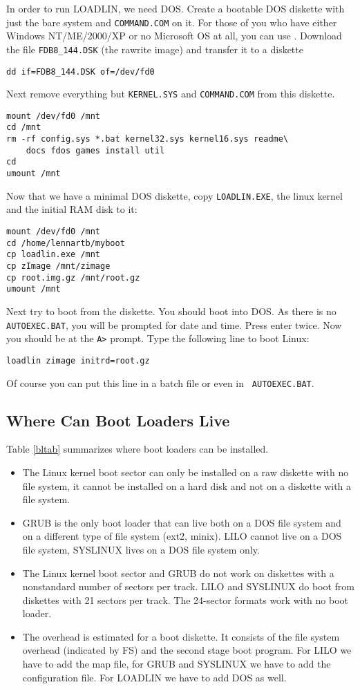 \documentclass[12pt,a4paper]{article}
\begin{document}
In order to run LOADLIN, we need DOS. Create a bootable DOS diskette with just
 the bare system and {\tt COMMAND.COM} on it. For those of you who have either
 Windows NT/ME/2000/XP or no
Microsoft OS at all, you can use
. Download the file
{\tt FDB8\_144.DSK} (the rawrite image) and transfer it to a diskette
\begin{verbatim}
dd if=FDB8_144.DSK of=/dev/fd0
\end{verbatim}
Next remove everything but {\tt KERNEL.SYS} and {\tt COMMAND.COM} from
this diskette.
\begin{verbatim}
mount /dev/fd0 /mnt
cd /mnt
rm -rf config.sys *.bat kernel32.sys kernel16.sys readme\
    docs fdos games install util
cd
umount /mnt
\end{verbatim}

Now that we have a minimal DOS diskette, copy {\tt LOADLIN.EXE}, the
linux kernel and the initial RAM disk to it:
\begin{verbatim}
mount /dev/fd0 /mnt
cd /home/lennartb/myboot
cp loadlin.exe /mnt
cp zImage /mnt/zimage
cp root.img.gz /mnt/root.gz
umount /mnt
\end{verbatim}

Next try to boot from the diskette. You should boot into DOS. As there
is no {\tt AUTOEXEC.BAT}, you will be prompted for date and
time. Press enter twice. Now you should be at the \verb'A>' prompt.
Type the following line to boot Linux:
\begin{verbatim}
loadlin zimage initrd=root.gz
\end{verbatim}
Of course you can put this line in a batch file or even in {\tt
  AUTOEXEC.BAT}. 

\subsection{Where Can Boot Loaders Live}

Table \ref{bltab} summarizes where boot loaders can be installed.
\begin{itemize}
\item The Linux kernel boot sector can only be installed on a raw
  diskette with no file system, it cannot be installed on a hard disk
  and not on a diskette with a file system.
\item GRUB is the only boot loader that can live both on a DOS file
  system and on a different type of file system (ext2, minix). LILO
  cannot live on a DOS file system, SYSLINUX lives on a DOS file
  system only.
\item The Linux kernel boot sector and GRUB do not work on diskettes
  with a nonstandard number of sectors per track. LILO and SYSLINUX do
  boot from diskettes with 21 sectors per track. The 24-sector formats
  work with no boot loader.
\item The overhead is estimated for a boot diskette. It consists of
  the file system overhead (indicated by FS) and the second stage boot
  program. For LILO we have to add the map file, for GRUB and SYSLINUX
  we have to add the configuration file. For LOADLIN we have to add
  DOS as well.
\end{itemize}
\end{document}
